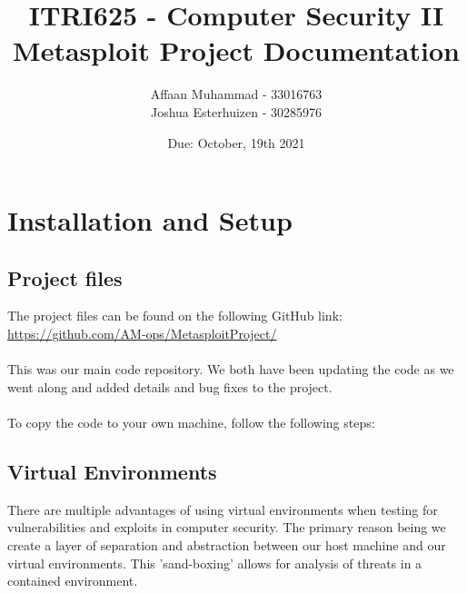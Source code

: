 \documentclass[a4paper, 12pt, titlepage]{report}
\begin{document}
\linespread{1.5}
\author{Affaan Muhammad - 33016763\\Joshua Esterhuizen - 30285976}
\title{ITRI625 - Computer Security II\\Metasploit Project Documentation}
\date{Due: October, 19th 2021}
\maketitle
\tableofcontents{}
\chapter{Installation and Setup}
\section{Project files}
The project files can be found on the following GitHub link:\\
\url{https://github.com/AM-ops/MetasploitProject/}
\\\\This was our main code repository. We both have been updating the code as we went along and added details and bug fixes to the project.\\\\
To copy the code to your own machine, follow the following steps:
\section{Virtual Environments}
There are multiple advantages of using virtual environments when testing for vulnerabilities and exploits in computer security. The primary reason being we create a layer of separation and abstraction between our host machine and our virtual environments. This 'sand-boxing' allows for analysis of threats in a contained environment.
\end{document}
